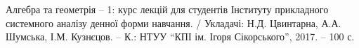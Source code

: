 Алгебра та геометрія – 1: курс лекцій для студентів Інституту прикладного
системного аналізу денної форми навчання. / Укладачі: Н.Д. Цвинтарна,
А.А. Шумська, І.М. Кузнєцов. – К.: НТУУ “КПІ ім. Ігоря Сікорського”, 2017. – 100 с.





